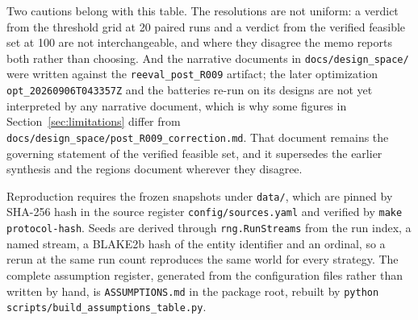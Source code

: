 \documentclass[11pt,letterpaper]{article}
\begin{document}
Two cautions belong with this table. The resolutions are not uniform: a verdict from the
threshold grid at 20 paired runs and a verdict from the verified feasible set at 100 are not
interchangeable, and where they disagree the memo reports both rather than choosing. And the
narrative documents in \texttt{docs/design\_space/} were written against the
\texttt{reeval\_post\_R009} artifact; the later optimization
\texttt{opt\_20260906T043357Z} and the batteries re-run on its designs are not yet
interpreted by any narrative document, which is why some figures in
Section~\ref{sec:limitations} differ from
\texttt{docs/design\_space/post\_R009\_correction.md}. That document remains the governing
statement of the verified feasible set, and it supersedes the earlier synthesis and the
regions document wherever they disagree.

Reproduction requires the frozen snapshots under \texttt{data/}, which are pinned by SHA-256
hash in the source register \texttt{config/sources.yaml} and verified by
\texttt{make protocol-hash}. Seeds are derived through \texttt{rng.RunStreams} from the run
index, a named stream, a BLAKE2b hash of the entity identifier and an ordinal, so a rerun at
the same run count reproduces the same world for every strategy. The complete assumption
register, generated from the configuration files rather than written by hand, is
\texttt{ASSUMPTIONS.md} in the package root, rebuilt by
\texttt{python scripts/build\_assumptions\_table.py}.
\end{document}
